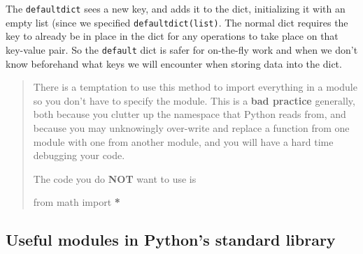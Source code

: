 \documentclass[
  letterpaper,
]{scrbook}
\newenvironment{Shaded}{\begin{snugshade}}{\end{snugshade}}
\newcommand{\ImportTok}[1]{#1}
\newcommand{\NormalTok}[1]{#1}
\newcommand{\OperatorTok}[1]{\textcolor[rgb]{0.81,0.36,0.00}{\textbf{#1}}}
\begin{document}
The \texttt{defaultdict} sees a new key, and adds it to the dict, initializing it with an empty list (since we specified \texttt{defaultdict(list)}. The normal dict requires the key to already be in place in the dict for any operations to take place on that key-value pair. So the \texttt{default} dict is safer for on-the-fly work and when we don't know beforehand what keys we will encounter when storing data into the dict.

\begin{quote}
There is a temptation to use this method to import everything in a module so you don't have to specify the module. This is a \textbf{bad practice} generally, both because you clutter up the namespace that Python reads from, and because you may unknowingly over-write and replace a function from one module with one from another module, and you will have a hard time debugging your code.

The code you do \textbf{NOT} want to use is

\begin{Shaded}
\begin{Highlighting}[]
\ImportTok{from}\NormalTok{ math }\ImportTok{import} \OperatorTok{*}
\end{Highlighting}
\end{Shaded}
\end{quote}

\hypertarget{useful-modules-in-pythons-standard-library}{%
\subsection{Useful modules in Python's standard library}\label{useful-modules-in-pythons-standard-library}}
\end{document}
